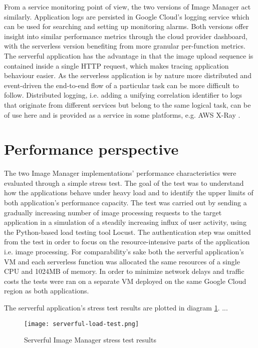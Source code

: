 From a service monitoring point of view, the two versions of Image Manager act similarly. Application logs are persisted in Google Cloud's logging service which can be used for searching and setting up monitoring alarms. Both versions offer insight into similar performance metrics through the cloud provider dashboard, with the serverless version benefiting from more granular per-function metrics. The serverful application has the advantage in that the image upload sequence is contained inside a single HTTP request, which makes tracing application behaviour easier. As the serverless application is by nature more distributed and event-driven the end-to-end flow of a particular task can be more difficult to follow. Distributed logging, i.e. adding a unifying correlation identifier to logs that originate from different services but belong to the same logical task, can be of use here and is provided as a service in some platforms, e.g. AWS X-Ray \parencite{awslambda0218}.

\section{Performance perspective}

The two Image Manager implementations' performance characteristics were evaluated through a simple stress test. The goal of the test was to understand how the applications behave under heavy load and to identify the upper limits of both application's performance capacity. The test was carried out by sending a gradually increasing number of image processing requests to the target application in a simulation of a steadily increasing influx of user activity, using the Python-based load testing tool Locust. The authentication step was omitted from the test in order to focus on the resource-intensive parts of the application i.e. image processing. For comparability's sake both the serverful application's VM and each serverless function was allocated the same resources of a single CPU and 1024MB of memory. In order to minimize network delays and traffic costs the tests were ran on a separate VM deployed on the same Google Cloud region as both applications.

The serverful application's stress test results are plotted in diagram \ref{fig:serverfulStressTest}. ...


\begin{figure}[h]
  \centering
  \texttt{[image: serverful-load-test.png]}
  \caption{Serverful Image Manager stress test results}
  \label{fig:serverfulStressTest}
\end{figure}

